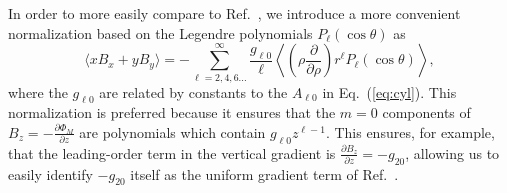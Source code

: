 \documentclass[preprint,12pt]{elsarticle}
\begin{document}
In order to more easily compare to Ref.~\cite{bib:pignol-roccia}, we
introduce a more convenient normalization based on the Legendre
polynomials $P_\ell(\cos\theta)$ as
\begin{equation}
    \langle xB_x+yB_y\rangle= -
    \sum_{\ell=2,4,6...}^{\infty}\frac{g_{\ell0}}{\ell}\left\langle\left(\rho\frac{\partial}{\partial
      \rho}\right)r^\ell P_\ell(\cos\theta)\right\rangle,
\end{equation}
where the $g_{\ell 0}$ are related by constants to the $A_{\ell 0}$ in
Eq.~(\ref{eq:cyl}).  This normalization is preferred because it
ensures that the $m=0$ components of
$B_{z}=-\frac{\partial\Phi_M}{\partial z}$ are polynomials which
contain $g_{\ell 0}z^{\ell-1}$.  This ensures, for example, that the
leading-order term in the vertical gradient is $\frac{\partial
  B_z}{\partial z}=-g_{20}$, allowing us to easily identify $-g_{20}$
itself as the uniform gradient term of Ref.~\cite{bib:pignol-roccia}.

\end{document}
